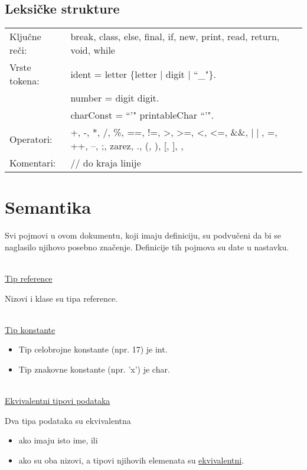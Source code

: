 \subsection*{Leksičke strukture}
 
\begin{tabular}{l l}

Ključne reči: & break, class, else, final, if, new, print, read, return, void, while \\ 
Vrste tokena: & ident = letter \{letter $\mid$ digit $\mid$ ``\_"\}.  \\ 
& number = digit {digit}.  \\
& charConst = ``'" printableChar ``'".  \\
Operatori: & +, -, *, /, \%, ==, !=, >, >=, <, <=, \&\&, $\mid \mid$, =, ++, --, ;, zarez, ., (, ), [, ], {, }  \\ 
Komentari: & // do kraja linije 
\end{tabular}

 
\section{Semantika}
 
Svi pojmovi u ovom dokumentu, koji imaju definiciju, su podvučeni da bi se naglasilo njihovo posebno 
značenje. Definicije tih pojmova su date u nastavku. 

\hspace{0cm} \\

\underline{Tip reference}

Nizovi i klase su tipa reference. 

\hspace{0cm} \\

\underline{Tip konstante}

\begin{itemize}
\item Tip celobrojne konstante (npr. 17) je int. 
\item Tip znakovne konstante (npr. 'x') je char. 
\end{itemize}

\hspace{0cm} \\
 
\underline{Ekvivalentni tipovi podataka}

Dva tipa podataka su ekvivalentna

\begin{itemize}
\item ako imaju isto ime, ili 
\item ako su oba nizovi, a tipovi njihovih elemenata su \underline{ekvivalentni}. 
\end{itemize}
 
